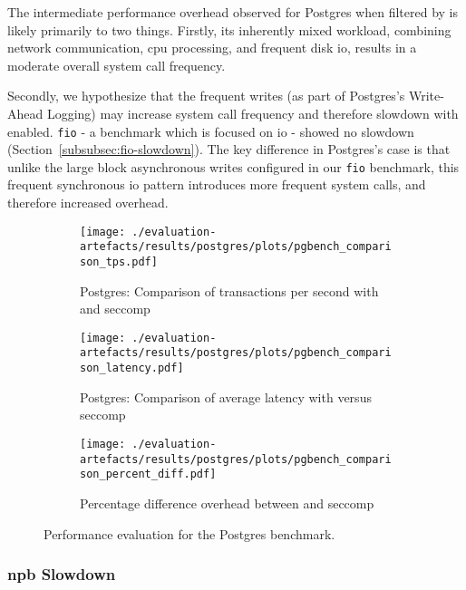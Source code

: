 The intermediate performance overhead observed for Postgres when filtered
by \af is likely primarily to two things. Firstly, its inherently  mixed
workload, combining network communication, \ac{cpu} processing, and frequent
disk \ac{io}, results in a moderate overall system call frequency. 

Secondly, we hypothesize that the frequent writes (as part of Postgres's
Write-Ahead Logging) may increase system call frequency and therefore slowdown
with \af enabled. \texttt{fio} - a benchmark which is focused on \ac{io} -
showed no slowdown (Section~\ref{subsubsec:fio-slowdown}). The key difference in
Postgres's case is that unlike the large block asynchronous writes
configured in our \texttt{fio} benchmark, this frequent synchronous \ac{io}
pattern introduces more frequent system calls, and therefore increased overhead.

\begin{figure}[htbp]
    \centering
    \begin{subfigure}[b]{0.45 \textwidth}
        \centering
        \texttt{[image: ./evaluation-artefacts/results/postgres/plots/pgbench\_comparison\_tps.pdf]} 
        \caption{Postgres: Comparison of transactions per second with \af
        and seccomp}
        \label{fig:pgs-txs}
    \end{subfigure}
    \hfill
     \begin{subfigure}[b]{0.45 \textwidth}
        \centering
        \texttt{[image: ./evaluation-artefacts/results/postgres/plots/pgbench\_comparison\_latency.pdf]} 
        \caption{Postgres: Comparison of average latency with \af versus
        seccomp}
        \label{fig:pgs-time}
    \end{subfigure}
     \medskip 
     \begin{subfigure}[b]{0.45 \textwidth}
        \centering
        \texttt{[image: ./evaluation-artefacts/results/postgres/plots/pgbench\_comparison\_percent\_diff.pdf]} %
        \caption{Percentage difference overhead between \af and seccomp}
        \label{fig:pgs-percdiff}
    \end{subfigure}

    \caption{Performance evaluation for the Postgres benchmark.}
    \label{fig:pgs-perf}
\end{figure}


\subsubsection{\ac{npb} Slowdown}\label{subsubsec:npb-slowdown}

